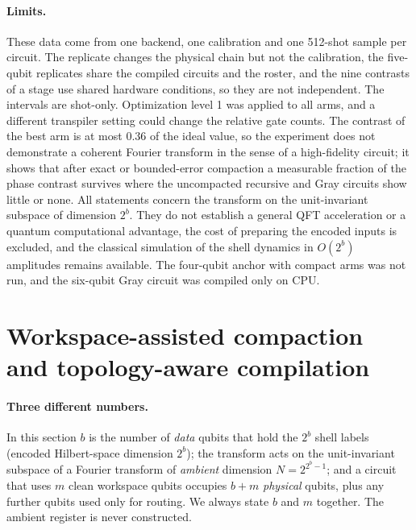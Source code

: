 \documentclass[11pt]{article}
\begin{document}
\paragraph{Limits.} These data come from one backend, one calibration and one 512-shot sample per circuit. The replicate changes the physical chain but not the calibration, the five-qubit replicates share the compiled circuits and the roster, and the nine contrasts of a stage use shared hardware conditions, so they are not independent. The intervals are shot-only. Optimization level 1 was applied to all arms, and a different transpiler setting could change the relative gate counts. The contrast of the best arm is at most $0.36$ of the ideal value, so the experiment does not demonstrate a coherent Fourier transform in the sense of a high-fidelity circuit; it shows that after exact or bounded-error compaction a measurable fraction of the phase contrast survives where the uncompacted recursive and Gray circuits show little or none. All statements concern the transform on the unit-invariant subspace of dimension $2^b$. They do not establish a general QFT acceleration or a quantum computational advantage, the cost of preparing the encoded inputs is excluded, and the classical simulation of the shell dynamics in $O(2^b)$ amplitudes remains available. The four-qubit anchor with compact arms was not run, and the six-qubit Gray circuit was compiled only on CPU.

\section{Workspace-assisted compaction and topology-aware compilation}\label{sec:workspace}
\paragraph{Three different numbers.} In this section $b$ is the number of \emph{data} qubits that hold the $2^b$ shell labels (encoded Hilbert-space dimension $2^b$); the transform acts on the unit-invariant subspace of a Fourier transform of \emph{ambient} dimension $N=2^{2^b-1}$; and a circuit that uses $m$ clean workspace qubits occupies $b+m$ \emph{physical} qubits, plus any further qubits used only for routing. We always state $b$ and $m$ together. The ambient register is never constructed.
\end{document}
